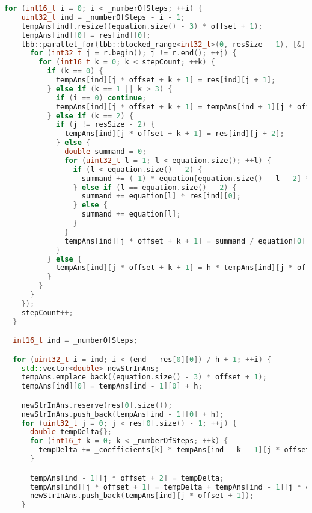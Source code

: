\documentclass{report}
\begin{document}
\begin{lstlisting}[language=C++,caption=TBB версия]
  for (int16_t i = 0; i < _numberOfSteps; ++i) {
    uint32_t ind = _numberOfSteps - i - 1;
    tempAns[ind].resize((equation.size() - 3) * offset + 1);
    tempAns[ind][0] = res[ind][0];
    tbb::parallel_for(tbb::blocked_range<int32_t>(0, resSize - 1), [&](const tbb::blocked_range<int32_t>& r) {
      for (int32_t j = r.begin(); j != r.end(); ++j) {
        for (int16_t k = 0; k < stepCount; ++k) {
          if (k == 0) {
            tempAns[ind][j * offset + k + 1] = res[ind][j + 1];
          } else if (k == 1 || k > 3) {
            if (i == 0) continue;
            tempAns[ind][j * offset + k + 1] = tempAns[ind + 1][j * offset + k] - tempAns[ind][j * offset + k];
          } else if (k == 2) {
            if (j != resSize - 2) {
              tempAns[ind][j * offset + k + 1] = res[ind][j + 2];
            } else {
              double summand = 0;
              for (uint32_t l = 1; l < equation.size(); ++l) {
                if (l < equation.size() - 2) {
                  summand += (-1) * equation[equation.size() - l - 2] * tempAns[ind][(l - 1) * offset + k - 1];
                } else if (l == equation.size() - 2) {
                  summand += equation[l] * res[ind][0];
                } else {
                  summand += equation[l];
                }
              }
              tempAns[ind][j * offset + k + 1] = summand / equation[0];
            }
          } else {
            tempAns[ind][j * offset + k + 1] = h * tempAns[ind][j * offset + k];
          }
        }
      }
    });
    stepCount++;
  }

  int16_t ind = _numberOfSteps;

  for (uint32_t i = ind; i < (end - res[0][0]) / h + 1; ++i) {
    std::vector<double> newStrInAns;
    tempAns.emplace_back((equation.size() - 3) * offset + 1);
    tempAns[ind][0] = tempAns[ind - 1][0] + h;

    newStrInAns.reserve(res[0].size());
    newStrInAns.push_back(tempAns[ind - 1][0] + h);
    for (uint32_t j = 0; j < res[0].size() - 1; ++j) {
      double tempDelta{};
      for (int16_t k = 0; k < _numberOfSteps; ++k) {
        tempDelta += _coefficients[k] * tempAns[ind - k - 1][j * offset + 4 + k];
      }

      tempAns[ind - 1][j * offset + 2] = tempDelta;
      tempAns[ind][j * offset + 1] = tempDelta + tempAns[ind - 1][j * offset + 1];
      newStrInAns.push_back(tempAns[ind][j * offset + 1]);
    }


\end{lstlisting}
\end{document}
